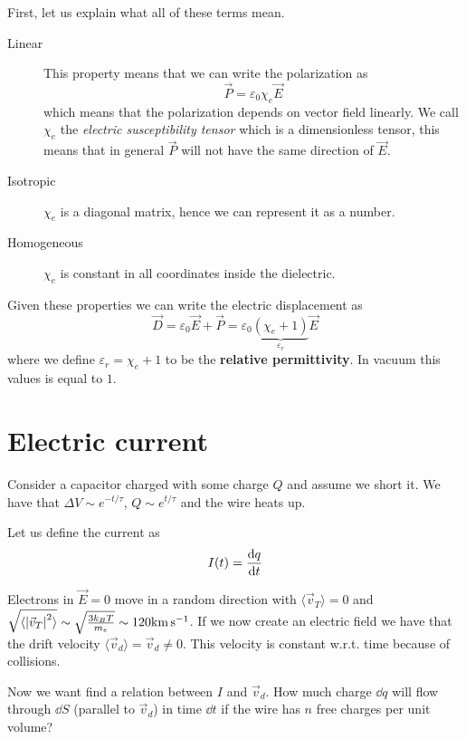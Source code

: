 \documentclass[12pt]{extarticle}
\begin{document}
First, let us explain what all of these terms mean.
\begin{description}
	\item[Linear]
	      This property means that we can write the polarization as
	      \begin{equation}
		      \vec P = \varepsilon_0 \chi _e \vec E
	      \end{equation}
	      which means that the polarization depends on vector field linearly.
	      We call $\chi_e$ the \emph{electric susceptibility tensor} which is a dimensionless tensor,
	      this means that in general $\vec P$ will not have the same direction of $\vec E$.

	\item[Isotropic] $\chi_e$ is a diagonal matrix, hence we can represent it as a number.
	\item[Homogeneous] $\chi_e$ is constant in all coordinates inside the dielectric.
\end{description}

Given these properties we can write the electric displacement as
\begin{equation}
	\vec D = \varepsilon_0 \vec E + \vec P = \varepsilon_0 \underbrace{(\chi_e + 1)}_{\varepsilon_r} \vec E
\end{equation}
where we define $\varepsilon_r = \chi_e + 1$ to be the \textbf{relative permittivity}.
In vacuum this values is equal to $1$.

\section{Electric current}

Consider a capacitor charged with some charge $Q$ and assume we short it.
We have that $\Delta V \sim e^{-t/\tau}$, $Q \sim e^{t/\tau}$ and the wire heats up.

Let us define the current as
\begin{equation}
	I(t) = \dv{q}{t}
\end{equation}

Electrons in $\vec E = 0$ move in a random direction with
$\langle \vec v_T \rangle = 0$ and
$\sqrt{\langle \abs{\vec v_T}^2 \rangle} \sim \sqrt{\frac{3 k_B T}{m_e}} \sim 120 \si{\kilo \meter \per \second}$.
If we now create an electric field we have that the drift velocity $\langle \vec v_d \rangle = \vec v_d \neq 0$.
This velocity is constant w.r.t. time because of collisions.

Now we want find a relation between $I$ and $\vec v_d$.
How much charge $\dd q$ will flow through $\dd S$ (parallel to $\vec v_d$) in time $\dd t$
if the wire has $n$ free charges per unit volume?
\end{document}
